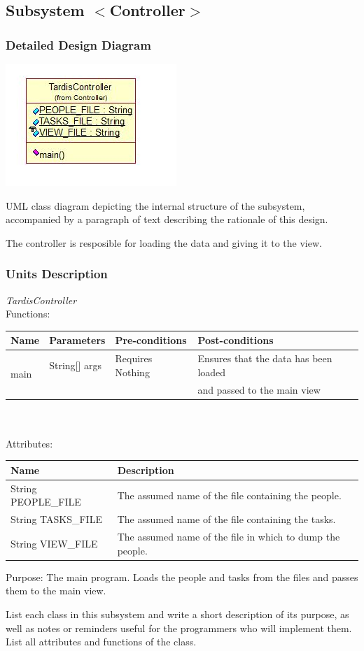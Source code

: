 \subsection{Subsystem $<$Controller$>$}

\subsubsection{Detailed Design Diagram}
\includegraphics{subsystems/diagrams/controller_class_diagram.jpg}

UML class diagram depicting the internal structure of the subsystem,
accompanied by a paragraph of text describing the rationale of this design.

The controller is resposible for loading the data and giving it to the view.

\subsubsection{Units Description}

\emph{TardisController}\\
Functions:\\
\begin{tabular}{| l | l | l | l |}
\hline
Name & Parameters & Pre-conditions & Post-conditions\\
\hline
\multirow{2}{*}{main} & String[] args & Requires Nothing & Ensures that the data has been loaded\\ 
			 &  & & and passed to the main view
\\
\hline
\end{tabular}\\
\\
Attributes:\\
\begin{tabular}{| l | l |}
\hline
Name & Description\\
\hline
String PEOPLE\_FILE & The assumed name of the file containing the people.\\
\hline
String TASKS\_FILE & The assumed name of the file containing the tasks.\\
\hline
String VIEW\_FILE & The assumed name of the file in which to dump the people.\\
\hline 
\end{tabular}

Purpose: The main program. Loads the people and tasks from the files and passes them to the main view.

List each class in this subsystem and write a short description of its purpose,
as well as notes or reminders useful for the programmers who will implement them.
List all attributes and functions of the class.